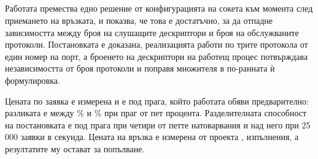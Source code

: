 \subsection*{}

Работата премества едно решение от конфигурацията на сокета към момента след приемането на
връзката, и показва, че това е достатъчно, за да отпадне зависимостта между броя на слушащите
дескриптори и броя на обслужваните протоколи. Постановката е доказана, реализацията работи по
трите протокола от един номер на порт, а броенето на дескриптори на работещ процес потвърждава
независимостта от броя протоколи и поправя множителя в по-ранната ѝ формулировка.

Цената по заявка е измерена и е под прага, който работата обяви предварително: разликата е
между \% и \% при праг от пет процента.
Разделителната способност на постановката е под прага при четири от петте натоварвания и над
него при 25\,000 заявки в секунда. Цената на връзка е измерена от проекта ,
 изпълнения, а резултатите му остават за попълване.

